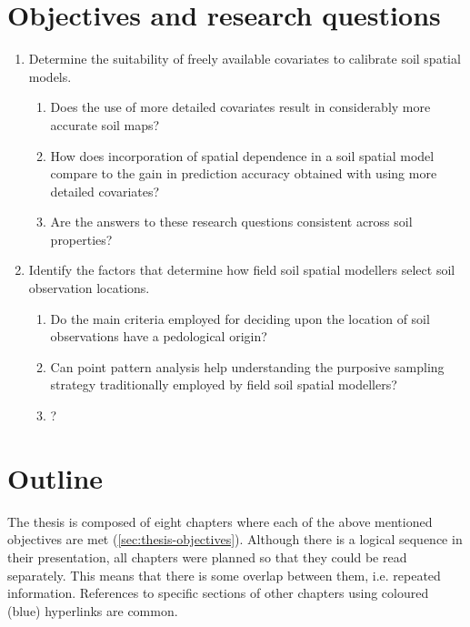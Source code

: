 \section{Objectives and research questions}
\label{sec:thesis-objectives}

\begin{enumerate}
 \item Determine the suitability of freely available covariates to calibrate soil spatial models.

  \begin{enumerate}[label=(\alph*)]
   \item Does the use of more detailed covariates result in considerably more accurate soil maps?
   
   \item How does incorporation of spatial dependence in a soil spatial model compare to the gain in 
   prediction accuracy obtained with using more detailed covariates?
   
   \item Are the answers to these research questions consistent across soil properties?
  \end{enumerate}
 
 \item Identify the factors that determine how field soil spatial modellers select soil observation locations.
  
  \begin{enumerate}[label=(\alph*)]
   \item Do the main criteria employed for deciding upon the location of soil observations have a pedological 
   origin?
   
   \item Can point pattern analysis help understanding the purposive sampling strategy traditionally employed
   by field soil spatial modellers?
   
   
   
   \item ?
  \end{enumerate}
 
\end{enumerate}




\section{Outline}
\label{sec:thesis-outline}

The thesis is composed of eight chapters where each of the above mentioned objectives are met 
(\autoref{sec:thesis-objectives}). Although there is a logical sequence in their presentation, all chapters 
were planned so that they could be read separately. This means that there is some overlap between them, i.e. 
repeated information. References to specific sections of other chapters using coloured (blue) hyperlinks are 
common.

